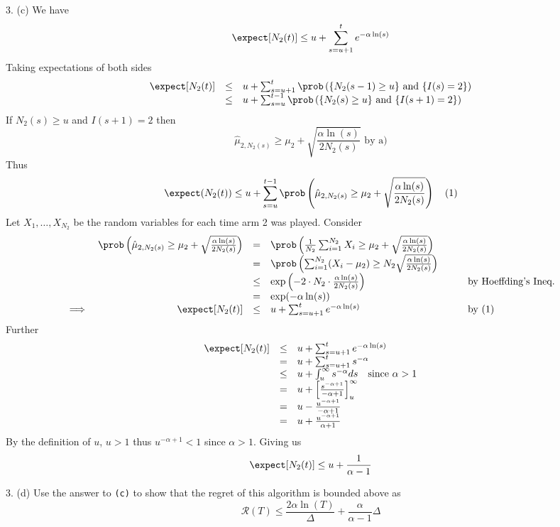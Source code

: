 \documentclass[11pt,a4paper]{article}
\begin{document}
\begin{answer}{3. (c)}
  We have
  \[ \expect[N_2(t)]\leq u+\sum_{s=u+1}^te^{-\alpha\ln(s)} \]
  Taking expectations of both sides
  \[\begin{array}{rcl}
  \expect[N_2(t)]&\leq&u+\sum_{s=u+1}^t\prob\left(\{N_2(s-1)\geq u\}\text{ and }\{I(s)=2\}\right)\\
  &\leq&u+\sum_{s=u}^{t-1}\prob\left(\{N_2(s)\geq u\}\text{ and }\{I(s+1)=2\}\right)
  \end{array}\]
  If $N_2(s)\geq u$ and $I(s+1)=2$ then
  \[ \hat\mu_{2,N_2(s)}\geq\mu_2+\sqrt{\frac{\alpha\ln(s)}{2N_2(s)}}\text{ by a)} \]
  Thus
  \[ \expect(N_2(t))\leq u+\sum_{s=u}^{t-1}\prob\left(\hat\mu_{2,N_2(s)}\geq\mu_2+\sqrt{\frac{\alpha\ln(s)}{2N_2(s)}}\right)\quad(1) \]
  Let $X_1,\dots,X_{N_2}$ be the random variables for each time arm 2 was played. Consider
  \[\begin{array}{rrclcl}
  &\prob\left(\hat\mu_{2,N_2(s)}\geq\mu_2+\sqrt{\frac{\alpha\ln(s)}{2N_2(s)}}\right)&=&\prob\left(\frac{1}{N_2}\sum_{i=1}^{N_2}X_i\geq\mu_2+\sqrt{\frac{\alpha\ln(s)}{2N_2(s)}}\right)&\quad&\\
  &&=&\prob\left(\sum_{i=1}^{N_2}(X_i-\mu_2)\geq N_2\sqrt{\frac{\alpha\ln(s)}{2N_2(s)}}\right)\\
  &&\leq&\text{exp}\left(-2\cdot N_2\cdot\frac{\alpha\ln(s)}{2N_2(s)}\right)&&\text{by Hoeffding's Ineq.}\\
  &&=&\text{exp}(-\alpha\ln(s))\\
  \implies&\expect[N_2(t)]&\leq&u+\sum_{s=u+1}^te^{-\alpha\ln(s)}&&\text{by (1)}
  \end{array}\]
  Further
  \[\begin{array}{rcl}
    \expect[N_2(t)]&\leq&u+\sum_{s=u+1}^te^{-\alpha\ln(s)}\\
    &=&u+\sum_{s=u+1}^ts^{-\alpha}\\
    &\leq&u+\int_u^\infty s^{-\alpha}ds\quad\text{since }\alpha>1\\
    &=&u+\left[\frac{s^{-\alpha+1}}{-\alpha+1}\right]_u^\infty\\
    &=&u-\frac{u^{-\alpha+1}}{-\alpha+1}\\
    &=&u+\frac{u^{-\alpha+1}}{\alpha+1}
  \end{array}\]
  By the definition of $u$, $u>1$ thus $u^{-\alpha+1}<1$ since $\alpha>1$. Giving us
  \[ \expect[N_2(t)]\leq u+\frac1{\alpha-1} \]
\end{answer}

\begin{question}{3. (d)}
  Use the answer to \texttt{(c)} to show that the regret of this algorithm is bounded above as
  \[ \mathcal{R}(T)\leq\frac{2\alpha\ln(T)}\Delta+\frac{\alpha}{\alpha-1}\Delta \]
\end{question}
\end{document}
